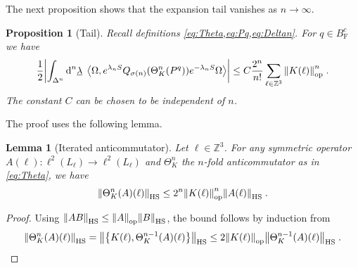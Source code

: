 \documentclass[12pt,a4paper]{article}
\numberwithin{equation}{section}
\newcommand{\1}{\mathbb{I}}
\newcommand{\di}{\textnormal{d}}
\newcommand{\F}{\mathrm{F}}
\newcommand{\HS}{\mathrm{HS}}
\newcommand{\Zstar}{\mathbb{Z}^3} %
\newcommand{\Z}{\mathbb{Z}}
\newcommand{\half}{\frac{1}{2}}
\newcommand{\eva}[1]{\left\langle #1 \right\rangle}
\theoremstyle{plain}
\newtheorem{lemma}[theorem]{Lemma}
\newtheorem{proposition}[theorem]{Proposition}
\theoremstyle{definition}
\theoremstyle{remark}
\theoremstyle{plain}
\theoremstyle{definition}
\theoremstyle{remark}
\begin{document}
The next proposition shows that the expansion tail vanishes as $ n \to \infty $.
%
\begin{proposition}[Tail]\label{prop:headerr}
Recall definitions \cref{eq:Theta,eq:Pq,eq:Deltan}. For $q \in B^c_{\F}$ we have
\begin{equation}\label{eq:headest}
	\half \abs{\int_{\Delta^n} \di^n\underline{\lambda} \;
		\eva{\Omega, e^{\lambda_n S}Q_{\sigma(n)}(\Theta^n_{K}(P^q)) e^{-\lambda_n S} \Omega} }
	\leq C \frac{2^n}{n!} \sum_{\ell \in \Zstar} \norm{K(\ell)}^n_{\mathrm{op}} \;.
\end{equation}
The constant $C$ can be chosen to be independent of $n$.
\end{proposition}
%
The proof uses the following lemma.
%
\begin{lemma}[Iterated anticommutator]\label{lem:multicommest}
Let $ \ell \in \Zstar $. For any symmetric operator $ A(\ell): \ell^2(L_\ell) \to \ell^2(L_\ell) $ and $\Theta^n_K$ the $ n $-fold anticommutator as in \eqref{eq:Theta}, we have
\begin{equation}
	\norm{\Theta^{n}_K(A)(\ell)}_{\HS}
	\leq 2^n \norm{K(\ell)}^{n}_{\mathrm{op}}\norm{A(\ell)}_{\HS} \;.
\end{equation}
\end{lemma}
%
\begin{proof}
Using $\norm{AB}_{\HS} \leq \norm{A}_{\mathrm{op}} \norm{B}_{\HS}$, the bound follows by induction from
\[
	\norm{\Theta^{n}_K(A)(\ell)}_{\HS}
	= \norm{\left\{K(\ell),\Theta^{n-1}_K(A)(\ell)\right\}}_{\HS}
	\leq 2 \norm{K(\ell)}_{\mathrm{op}}\norm{\Theta^{n-1}_K(A)(\ell)}_{\HS} \;. \qedhere
\]
\end{proof}
\end{document}
